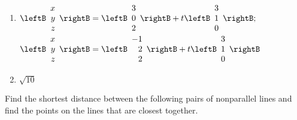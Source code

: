 \begin{multicols}{2}
\begin{ex}
\begin{enumerate}[label={\alph*.}]
\item 
$\leftB
\begin{array}{r}
x\\
y\\
z
\end{array}
\rightB
=
\leftB
\begin{array}{r}
3\\
0\\
2
\end{array}
\rightB
+t
\leftB
\begin{array}{r}
3\\
1\\
0
\end{array}
\rightB; $ \\ $
\leftB
\begin{array}{r}
x\\
y\\
z
\end{array}
\rightB
=
\leftB
\begin{array}{r}
-1\\
2\\
2
\end{array}
\rightB
+t
\leftB
\begin{array}{r}
3\\
1\\
0
\end{array}
\rightB$

\end{enumerate}
\begin{sol}
\begin{enumerate}[label={\alph*.}]
\setcounter{enumi}{1}
\item  $\sqrt{10}$

\end{enumerate}
\end{sol}
\end{ex}

\begin{ex}
Find the shortest distance between the following pairs of nonparallel lines and find the points on the lines that are closest together.


\end{ex}
\end{multicols}
